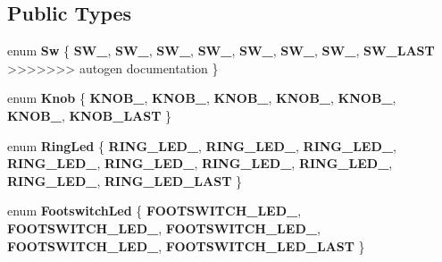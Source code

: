 \begin{DoxyCompactItemize}
\subsection*{Public Types}
\begin{DoxyCompactItemize}
\item 
\mbox{\label{classdaisy_1_1_daisy_petal_a2651bb58e6ae33c0bd4bc770df3c7911}} 
enum {\bfseries Sw} \{ \newline
{\bfseries S\+W\+\_}, 
{\bfseries S\+W\+\_}, 
{\bfseries S\+W\+\_}, 
{\bfseries S\+W\+\_}, 
\newline
{\bfseries S\+W\+\_}, 
{\bfseries S\+W\+\_}, 
{\bfseries S\+W\+\_}, 
{\bfseries S\+W\+\_\+\+L\+A\+ST}
>>>>>>> autogen documentation
 \}
\item 
\mbox{\label{classdaisy_1_1_daisy_petal_a0273fd343346e74767bb5fc7bd290d64}} 
enum {\bfseries Knob} \{ \newline
{\bfseries K\+N\+O\+B\+\_}, 
{\bfseries K\+N\+O\+B\+\_}, 
{\bfseries K\+N\+O\+B\+\_}, 
{\bfseries K\+N\+O\+B\+\_}, 
\newline
{\bfseries K\+N\+O\+B\+\_}, 
{\bfseries K\+N\+O\+B\+\_}, 
{\bfseries K\+N\+O\+B\+\_\+\+L\+A\+ST}
 \}
\item 
\mbox{\label{classdaisy_1_1_daisy_petal_a6b6b85167d6938e7b4d151599773d682}} 
enum {\bfseries Ring\+Led} \{ \newline
{\bfseries R\+I\+N\+G\+\_\+\+L\+E\+D\+\_}, 
{\bfseries R\+I\+N\+G\+\_\+\+L\+E\+D\+\_}, 
{\bfseries R\+I\+N\+G\+\_\+\+L\+E\+D\+\_}, 
{\bfseries R\+I\+N\+G\+\_\+\+L\+E\+D\+\_}, 
\newline
{\bfseries R\+I\+N\+G\+\_\+\+L\+E\+D\+\_}, 
{\bfseries R\+I\+N\+G\+\_\+\+L\+E\+D\+\_}, 
{\bfseries R\+I\+N\+G\+\_\+\+L\+E\+D\+\_}, 
{\bfseries R\+I\+N\+G\+\_\+\+L\+E\+D\+\_}, 
\newline
{\bfseries R\+I\+N\+G\+\_\+\+L\+E\+D\+\_\+\+L\+A\+ST}
 \}
\item 
\mbox{\label{classdaisy_1_1_daisy_petal_ad833e85c076a9fc4c3ad16cb8f09b06d}} 
enum {\bfseries Footswitch\+Led} \{ \newline
{\bfseries F\+O\+O\+T\+S\+W\+I\+T\+C\+H\+\_\+\+L\+E\+D\+\_}, 
{\bfseries F\+O\+O\+T\+S\+W\+I\+T\+C\+H\+\_\+\+L\+E\+D\+\_}, 
{\bfseries F\+O\+O\+T\+S\+W\+I\+T\+C\+H\+\_\+\+L\+E\+D\+\_}, 
{\bfseries F\+O\+O\+T\+S\+W\+I\+T\+C\+H\+\_\+\+L\+E\+D\+\_}, 
\newline
{\bfseries F\+O\+O\+T\+S\+W\+I\+T\+C\+H\+\_\+\+L\+E\+D\+\_\+\+L\+A\+ST}
 \}
\end{DoxyCompactItemize}

\end{DoxyCompactItemize}
